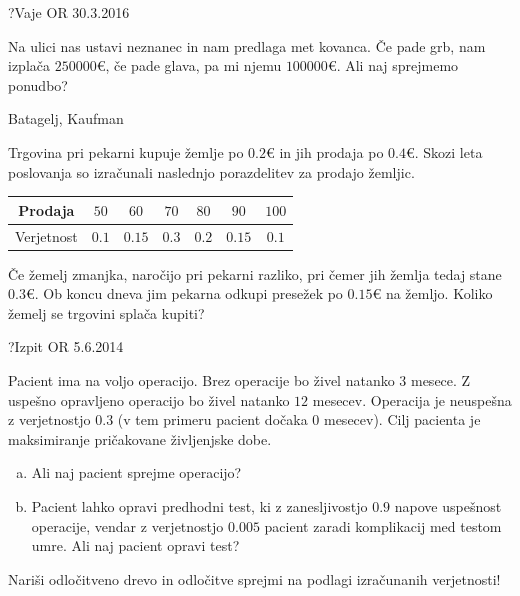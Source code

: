 
\begin{naloga}{?}{Vaje OR 30.3.2016}
\begin{vprasanje}
Na ulici nas ustavi neznanec in nam predlaga met kovanca.
Če pade grb, nam izplača $250000 €$,
če pade glava, pa mi njemu $100000 €$.
Ali naj sprejmemo ponudbo?

\end{vprasanje}
\begin{odgovor}
\end{odgovor}
\end{naloga}


\begin{naloga}{Batagelj, Kaufman}{\cite[Naloga~4.2]{bk}}
\begin{vprasanje}
Trgovina pri pekarni kupuje žemlje po $0.2 €$
in jih prodaja po $0.4 €$.
Skozi leta poslovanja so izračunali naslednjo porazdelitev za prodajo žemljic.
\begin{center}
\begin{tabular}{c|cccccc}
Prodaja & $50$ & $60$ & $70$ & $80$ & $90$ & $100$ \\
\hline
Verjetnost & $0.1$ & $0.15$ & $0.3$ & $0.2$ & $0.15$ & $0.1$
\end{tabular}
\end{center}
Če žemelj zmanjka, naročijo pri pekarni razliko,
pri čemer jih žemlja tedaj stane $0.3 €$.
Ob koncu dneva jim pekarna odkupi presežek po $0.15 €$ na žemljo.
Koliko žemelj se trgovini splača kupiti?

\end{vprasanje}
\begin{odgovor}
\end{odgovor}
\end{naloga}


\begin{naloga}{?}{Izpit OR 5.6.2014}
\begin{vprasanje}
Pacient ima na voljo operacijo.
Brez operacije bo živel natanko $3$ mesece.
Z uspešno opravljeno operacijo bo živel natanko $12$ mesecev.
Operacija je neuspešna z verjetnostjo $0.3$
(v tem primeru pacient dočaka $0$ mesecev).
Cilj pacienta je maksimiranje pričakovane življenjske dobe.
\begin{enumerate}[(a)]
\item Ali naj pacient sprejme operacijo?
\item Pacient lahko opravi predhodni test,
ki z zanesljivostjo $0.9$ napove uspeš\-nost operacije,
vendar z verjetnostjo $0.005$ pacient zaradi komplikacij med testom umre.
Ali naj pacient opravi test?
\end{enumerate}
Nariši odločitveno drevo
in odločitve sprejmi na podlagi izračunanih ve\-rjet\-no\-sti!
\end{vprasanje}
\begin{odgovor}
\end{odgovor}
\end{naloga}


